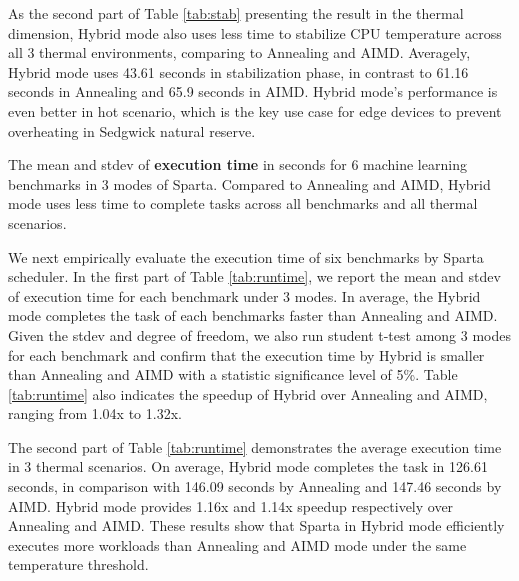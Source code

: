 

As the second part of Table \ref{tab:stab} presenting the result in the thermal dimension, Hybrid mode also uses less time to stabilize CPU temperature across all 3 thermal environments, comparing to Annealing and AIMD. Averagely, Hybrid mode uses 43.61 seconds in stabilization phase, in contrast to 61.16 seconds in Annealing and 65.9 seconds in AIMD. Hybrid mode's performance is even better in hot scenario, which is the key use case for edge devices to prevent overheating in Sedgwick natural reserve.

\begin{table}[t]
\caption{The mean and stdev of \textbf{execution time} in seconds for 6 machine learning benchmarks in 3 modes of Sparta. Compared to Annealing and AIMD, Hybrid mode uses less time to complete tasks across all benchmarks and all thermal scenarios. }\label{tab:runtime}
\vspace{1mm}
\centering
\resizebox{350pt}{!}{}
\newline
\vspace{3mm}
\newline
\resizebox{300pt}{!}{}
\end{table}


We next empirically evaluate the execution time of six benchmarks by Sparta scheduler. In the first part of Table \ref{tab:runtime}, we report the mean and stdev of execution time for each benchmark under 3 modes. In average, the Hybrid mode completes the task of each benchmarks faster than Annealing and AIMD. Given the stdev and degree of freedom, we also run student t-test among 3 modes for each benchmark and confirm that the execution time by Hybrid is smaller than Annealing and AIMD with a statistic significance level of 5\%. Table \ref{tab:runtime} also indicates the speedup of Hybrid over Annealing and AIMD, ranging from 1.04x to 1.32x. 

The second part of Table \ref{tab:runtime} demonstrates the average execution time in 3 thermal scenarios. On average, Hybrid mode completes the task in 126.61 seconds, in comparison with 146.09 seconds by Annealing and 147.46 seconds by AIMD. Hybrid mode provides 1.16x and 1.14x speedup respectively over Annealing and AIMD. These results show that Sparta in Hybrid mode efficiently executes more workloads than Annealing and AIMD mode under the same temperature threshold. 



